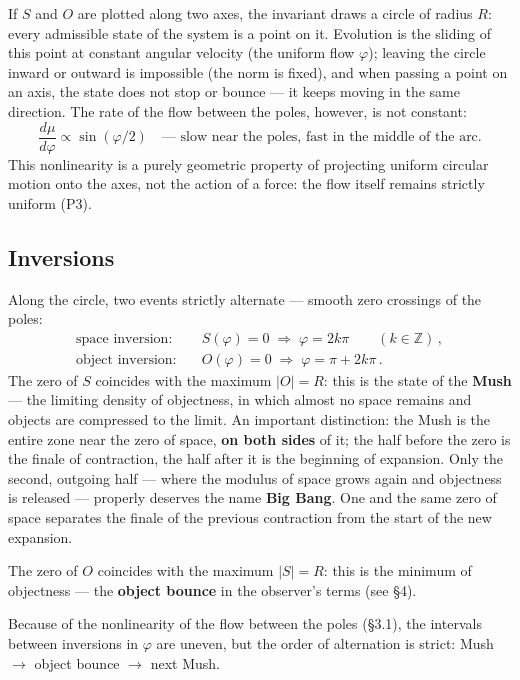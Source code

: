 \documentclass{article}
\begin{document}
If $S$ and $O$ are plotted along two axes, the invariant draws a circle of radius $R$: every admissible state of the system is a point on it. Evolution is the sliding of this point at constant angular velocity (the uniform flow $\varphi$); leaving the circle inward or outward is impossible (the norm is fixed), and when passing a point on an axis, the state does not stop or bounce --- it keeps moving in the same direction. The rate of the flow between the poles, however, is not constant:
\begin{equation}
\frac{d\mu}{d\varphi} \propto \sin(\varphi/2) \quad \text{--- slow near the poles, fast in the middle of the arc.}
\end{equation}
This nonlinearity is a purely geometric property of projecting uniform circular motion onto the axes, not the action of a force: the flow itself remains strictly uniform (P3).

\subsection{Inversions}

Along the circle, two events strictly alternate --- smooth zero crossings of the poles:
\begin{align}
\text{space inversion:} &\quad S(\varphi) = 0 \;\Rightarrow\; \varphi = 2k\pi \qquad (k \in \mathbb{Z})\,, \\
\text{object inversion:} &\quad O(\varphi) = 0 \;\Rightarrow\; \varphi = \pi + 2k\pi\,.
\end{align}
The zero of $S$ coincides with the maximum $|O| = R$: this is the state of the \textbf{Mush} --- the limiting density of objectness, in which almost no space remains and objects are compressed to the limit. An important distinction: the Mush is the entire zone near the zero of space, \textbf{on both sides} of it; the half before the zero is the finale of contraction, the half after it is the beginning of expansion. Only the second, outgoing half --- where the modulus of space grows again and objectness is released --- properly deserves the name \textbf{Big Bang}. One and the same zero of space separates the finale of the previous contraction from the start of the new expansion.

The zero of $O$ coincides with the maximum $|S| = R$: this is the minimum of objectness --- the \textbf{object bounce} in the observer's terms (see \S4).

Because of the nonlinearity of the flow between the poles (\S3.1), the intervals between inversions in $\varphi$ are uneven, but the order of alternation is strict: Mush $\to$ object bounce $\to$ next Mush.
\end{document}
